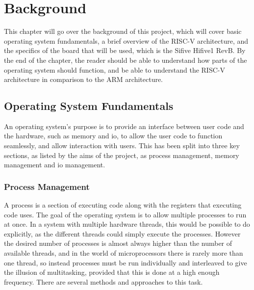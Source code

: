 \chapter[Background]{Background}
\label{cha:backgr}
This chapter will go over the background of this project, which will cover basic operating system fundamentals, a brief overview of the RISC-V architecture, and the specifics of the board that will be used, which is the Sifive Hifive1 RevB. By the end of the chapter, the reader should be able to understand how parts of the operating system should function, and be able to understand the RISC-V architecture in comparison to the ARM architecture.
\section{Operating System Fundamentals}
An operating system's purpose is to provide an interface between user code and the hardware, such as memory and \ac{io}, to allow the user code to function seamlessly, and allow interaction with users. This has been split into three key sections, as listed by the aims of the project, as process management, memory management and \ac{io} management\cite{modern_operating}.
\subsection{Process Management}
A process is a section of executing code along with the registers that executing code uses. The goal of the operating system is to allow multiple processes to run at once. In a system with multiple hardware threads, this would be possible to do explicitly, as the different threads could simply execute the processes. However the desired number of processes is almost always higher than the number of available threads, and in the world of microprocessors there is rarely more than one thread, so instead processes must be run individually and interleaved to give the illusion of multitasking, provided that this is done at a high enough frequency. There are several methods and approaches to this task\cite{modern_operating}.
